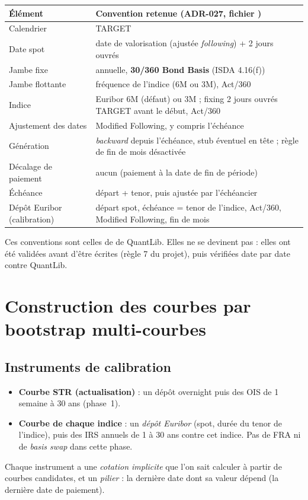 \documentclass[11pt,a4paper]{article}
\newcommand{\estr}{\texorpdfstring{\texteuro STR}{EUR STR}}
\newcommand{\code}[1]{\texttt{\detokenize{#1}}}
\theoremstyle{plain}
\theoremstyle{definition}
\theoremstyle{remark}
\begin{document}
\begin{center}
\begin{tabularx}{\linewidth}{@{}lX@{}}
\toprule
Élément & Convention retenue (ADR-027, fichier \code{EUR.json}) \\
\midrule
Calendrier & TARGET \\
Date spot & date de valorisation (ajustée \emph{following}) + 2 jours ouvrés \\
Jambe fixe & annuelle, \textbf{30/360 Bond Basis} (ISDA 4.16(f)) \\
Jambe flottante & fréquence de l'indice (6M ou 3M), Act/360 \\
Indice & Euribor 6M (défaut) ou 3M ; fixing 2 jours ouvrés TARGET avant le début, Act/360 \\
Ajustement des dates & Modified Following, y compris l'échéance \\
Génération & \emph{backward} depuis l'échéance, stub éventuel en tête ; règle de fin de mois désactivée \\
Décalage de paiement & aucun (paiement à la date de fin de période) \\
Échéance & départ + tenor, puis ajustée par l'échéancier \\
Dépôt Euribor (calibration) & départ spot, échéance = tenor de l'indice, Act/360, Modified Following, fin de mois \\
\bottomrule
\end{tabularx}
\end{center}
Ces conventions sont celles de \code{EuriborSwapIsdaFixA} de QuantLib. Elles ne se devinent pas : elles
ont été validées avant d'être écrites (règle 7 du projet), puis vérifiées date par date contre QuantLib.

\section{Construction des courbes par bootstrap multi-courbes}\label{sec:bootstrap}

\subsection{Instruments de calibration}
\begin{itemize}
  \item \textbf{Courbe \estr{} (actualisation)} : un dépôt overnight puis des OIS de 1 semaine à
    30 ans (phase~1).
  \item \textbf{Courbe de chaque indice} : un \emph{dépôt Euribor} (spot, durée du tenor de l'indice),
    puis des IRS annuels de 1 à 30 ans contre cet indice. Pas de FRA ni de \emph{basis swap} dans cette
    phase.
\end{itemize}
Chaque instrument a une \emph{cotation implicite} que l'on sait calculer à partir de courbes
candidates, et un \emph{pilier} : la dernière date dont sa valeur dépend (la dernière date de paiement).
\end{document}

